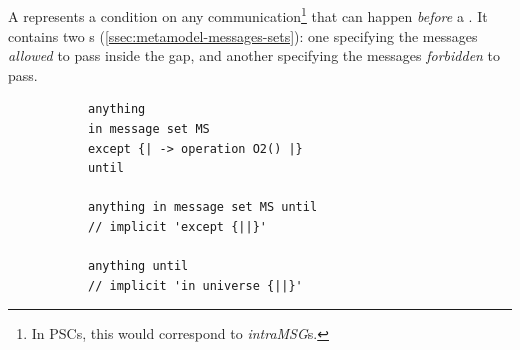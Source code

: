 \subsection{\msequencegap}\label{ssec:metamodel-sequences-gaps}

A \msequencegap{} represents a condition on any
communication\footnote{In PSCs, this would correspond to
  \emph{intraMSG}s.} that can happen \emph{before} a \msequenceaction.
It contains two \mmessageset s (\cref{ssec:metamodel-messages-sets}):
one specifying the messages \emph{allowed} to pass inside the gap, and
another specifying the messages \emph{forbidden} to pass.

\begin{figure}[h!]

  \begin{subfigure}[c]{\egtextwidth}
    \begin{lstlisting}[style=Example]
anything
in message set MS
except {| -> operation O2() |}
until

anything in message set MS until
// implicit 'except {||}'

anything until
// implicit 'in universe {||}'
\end{lstlisting}
  \end{subfigure}
  \hfill
  \begin{subfigure}[c]{\eggraphicalwidth}
    \gsecaption
    \centering
  \end{subfigure}

\end{figure}

